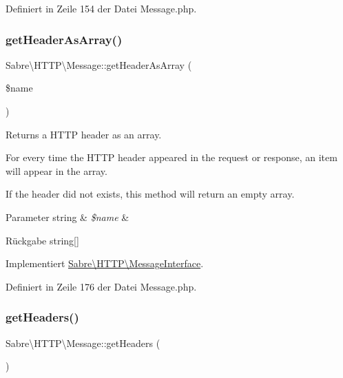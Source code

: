 Definiert in Zeile 154 der Datei Message.\+php.

\mbox{\label{class_sabre_1_1_h_t_t_p_1_1_message_a15a679683a423df9878d08e208433448}} 
\subsubsection{\texorpdfstring{get\+Header\+As\+Array()}{getHeaderAsArray()}}
{\footnotesize\ttfamily Sabre\textbackslash{}\+H\+T\+T\+P\textbackslash{}\+Message\+::get\+Header\+As\+Array (\begin{DoxyParamCaption}\item[{}]{\$name }\end{DoxyParamCaption})}

Returns a H\+T\+TP header as an array.

For every time the H\+T\+TP header appeared in the request or response, an item will appear in the array.

If the header did not exists, this method will return an empty array.


\begin{DoxyParams}[1]{Parameter}
string & {\em \$name} & \\
\hline
\end{DoxyParams}
\begin{DoxyReturn}{Rückgabe}
string\mbox{[}\mbox{]} 
\end{DoxyReturn}


Implementiert \mbox{\hyperlink{interface_sabre_1_1_h_t_t_p_1_1_message_interface_ab39e08a0f6abaa7540e0ea7e056760b3}{Sabre\textbackslash{}\+H\+T\+T\+P\textbackslash{}\+Message\+Interface}}.



Definiert in Zeile 176 der Datei Message.\+php.

\mbox{\label{class_sabre_1_1_h_t_t_p_1_1_message_aba056637d07f07a2cfa23f893f12940d}} 
\subsubsection{\texorpdfstring{get\+Headers()}{getHeaders()}}
{\footnotesize\ttfamily Sabre\textbackslash{}\+H\+T\+T\+P\textbackslash{}\+Message\+::get\+Headers (\begin{DoxyParamCaption}{ }\end{DoxyParamCaption})}

